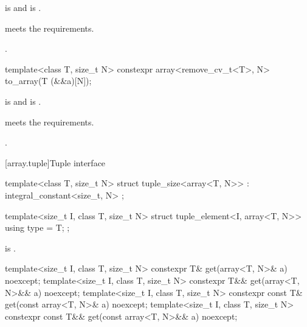 \begin{itemdescr}
\pnum
\mandates
{} is  and
 is .

\pnum
\expects
{} meets the  requirements.

\pnum
\returns
{}.
\end{itemdescr}

%
\begin{itemdecl}
template<class T, size_t N>
  constexpr array<remove_cv_t<T>, N> to_array(T (&&a)[N]);
\end{itemdecl}

\begin{itemdescr}
\pnum
\mandates
{} is  and
 is .

\pnum
\expects
{} meets the  requirements.

\pnum
\returns
{}.
\end{itemdescr}

[array.tuple]{Tuple interface}
%
%
%
%
\begin{itemdecl}
template<class T, size_t N>
  struct tuple_size<array<T, N>> : integral_constant<size_t, N> { };
\end{itemdecl}

%
\begin{itemdecl}
template<size_t I, class T, size_t N>
  struct tuple_element<I, array<T, N>> {
    using type = T;
  };
\end{itemdecl}

\begin{itemdescr}
\pnum
\mandates
{} is .
\end{itemdescr}

%
\begin{itemdecl}
template<size_t I, class T, size_t N>
  constexpr T& get(array<T, N>& a) noexcept;
template<size_t I, class T, size_t N>
  constexpr T&& get(array<T, N>&& a) noexcept;
template<size_t I, class T, size_t N>
  constexpr const T& get(const array<T, N>& a) noexcept;
template<size_t I, class T, size_t N>
  constexpr const T&& get(const array<T, N>&& a) noexcept;
\end{itemdecl}


